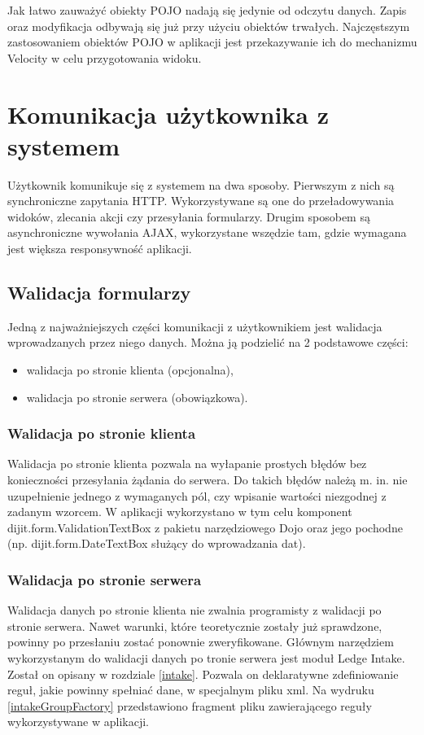 Jak łatwo zauważyć obiekty POJO nadają się jedynie od odczytu danych. Zapis oraz modyfikacja odbywają się już przy użyciu obiektów trwałych. Najczęstszym zastosowaniem obiektów POJO w aplikacji jest przekazywanie ich do mechanizmu Velocity w celu przygotowania widoku.

\section[Komunikacja użytkownika z systemem][Komunikacja użytkownika z systemem]{Komunikacja użytkownika z systemem}
Użytkownik komunikuje się z systemem na dwa sposoby. Pierwszym z nich są synchroniczne zapytania HTTP. Wykorzystywane są one do przeładowywania widoków, zlecania akcji czy przesyłania formularzy. Drugim sposobem są asynchroniczne wywołania AJAX, wykorzystane wszędzie tam, gdzie wymagana jest większa responsywność aplikacji.

\subsection[Walidacja formularzy][Walidacja formularzy]{Walidacja formularzy}
Jedną z najważniejszych części komunikacji z użytkownikiem jest walidacja wprowadzanych przez niego danych. Można ją podzielić na 2 podstawowe części:
\begin{itemize}
	\item walidacja po stronie klienta (opcjonalna),
	\item walidacja po stronie serwera (obowiązkowa).
\end{itemize}

\subsubsection{Walidacja po stronie klienta}
Walidacja po stronie klienta pozwala na wyłapanie prostych błędów bez konieczności przesyłania żądania do serwera. Do takich błędów należą m. in. nie uzupełnienie jednego z wymaganych pól, czy wpisanie wartości niezgodnej z zadanym wzorcem. W aplikacji wykorzystano w tym celu komponent dijit.form.ValidationTextBox z pakietu narzędziowego Dojo oraz jego pochodne (np. dijit.form.DateTextBox służący do wprowadzania dat).

\subsubsection{Walidacja po stronie serwera}
Walidacja danych po stronie klienta nie zwalnia programisty z walidacji po stronie serwera. Nawet warunki, które teoretycznie zostały już sprawdzone, powinny po przesłaniu zostać ponownie zweryfikowane. Głównym narzędziem wykorzystanym do walidacji danych po tronie serwera jest moduł Ledge Intake. Został on opisany w rozdziale \ref{intake}. Pozwala on deklaratywne zdefiniowanie reguł, jakie powinny spełniać dane, w specjalnym pliku xml. Na wydruku \ref{intakeGroupFactory} przedstawiono fragment pliku zawierającego reguły wykorzystywane w aplikacji.

